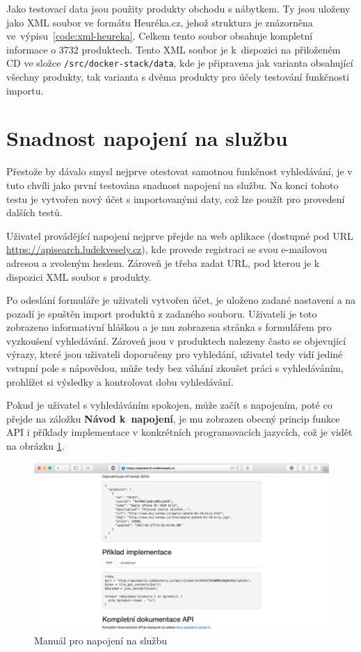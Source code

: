 \documentclass[FM,DP]{tulthesis}
\begin{document}
Jako testovací data jsou použity produkty obchodu s nábytkem. Ty jsou uloženy jako XML soubor
ve formátu Heuréka.cz, jehož struktura je znázorněna ve~výpisu~\ref{code:xml-heureka}. Celkem
tento soubor obsahuje kompletní informace o 3732 produktech. Tento XML soubor je k~dispozici
na přiloženém CD ve složce \verb|/src/docker-stack/data|, kde je připravena jak varianta obsahující
všechny produkty, tak varianta s dvěma produkty pro účely testování funkčnosti importu.

\section{Snadnost napojení na službu}

Přestože by dávalo smysl nejprve otestovat samotnou funkčnost vyhledávání, je v tuto chvíli jako
první testována snadnost napojení na službu. Na konci tohoto testu je vytvořen nový účet s importovanými
daty, což lze použít pro provedení dalších testů.

Uživatel provádějící napojení nejprve přejde na web aplikace (dostupné pod URL \url{https://apisearch.ludekvesely.cz}), 
kde provede registraci se svou e-mailovou adresou a zvoleným heslem. Zároveň je třeba zadat URL, pod
kterou je k dispozici XML soubor s produkty.

Po odeslání formuláře je uživateli vytvořen účet, je uloženo zadané nastavení a na pozadí je spuštěn
import produktů z zadaného souboru. Uživateli je toto zobrazeno informativní hláškou a je mu zobrazena
stránka s formulářem pro vyzkoušení vyhledávání. Zároveň jsou v produktech nalezeny často se objevující
výrazy, které jsou uživateli doporučeny pro vyhledání, uživatel tedy vidí jediné vstupní pole s nápovědou, 
může tedy bez váhání zkoušet práci s vyhledáváním, prohlížet si výsledky a kontrolovat dobu vyhledávání.

Pokud je uživatel s vyhledáváním spokojen, může začít s napojením, poté co přejde na záložku 
\textbf{Návod k~napojení}, je mu zobrazen obecný princip funkce API i příklady implementace v konkrétních
programovacích jazycích, což je vidět na obrázku \ref{connection}.

\begin{figure}[h]
\center
\includegraphics[width=\textwidth]{napojeni.png}
\caption{Manuál pro napojení na službu}
\label{connection}
\end{figure}
\end{document}
